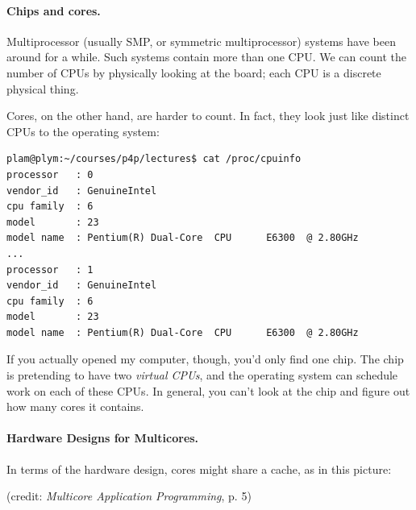 \documentclass[a4paper]{report}
\begin{document}
\paragraph{Chips and cores.} Multiprocessor (usually SMP, or symmetric
multiprocessor) systems have been around for a while. Such systems
contain more than one CPU. We can count the number of CPUs by
physically looking at the board; each CPU is a discrete physical thing.

Cores, on the other hand, are harder to count. In fact, they look just
like distinct CPUs to the operating system:

{\scriptsize \begin{verbatim}
plam@plym:~/courses/p4p/lectures$ cat /proc/cpuinfo
processor	: 0
vendor_id	: GenuineIntel
cpu family	: 6
model		: 23
model name	: Pentium(R) Dual-Core  CPU      E6300  @ 2.80GHz
...
processor	: 1
vendor_id	: GenuineIntel
cpu family	: 6
model		: 23
model name	: Pentium(R) Dual-Core  CPU      E6300  @ 2.80GHz
\end{verbatim}
}
\vspace*{-1em}
If you actually opened my computer, though, you'd only find one chip.
The chip is pretending to have two \emph{virtual CPUs}, and the
operating system can schedule work on each of these CPUs. In general,
you can't look at the chip and figure out how many cores it contains.

\vspace*{-1em}
\paragraph{Hardware Designs for Multicores.}
In terms of the hardware design, cores might share a cache, as in this picture:

\vspace*{-1em}
\begin{center}
\end{center}
\vspace*{-1em}
\hfill (credit: \emph{Multicore Application Programming}, p. 5)
\end{document}
